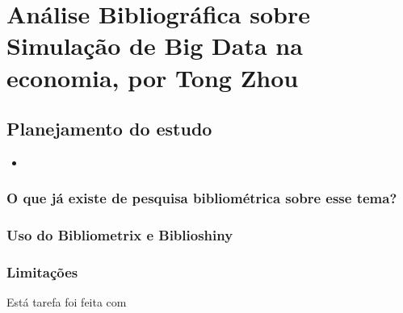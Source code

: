\chapter{Análise Bibliográfica sobre Simulação de Big Data na economia, por Tong Zhou\label{chap:bibliometria:jhcf}}


\section{Planejamento do estudo}



\begin{itemize}
    \item 
\end{itemize}


\subsection{O que já existe de pesquisa bibliométrica sobre esse tema?}


\subsection{Uso do Bibliometrix e Biblioshiny}


\subsection{Limitações} 
Está tarefa foi feita com


